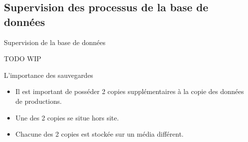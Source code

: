 
\subsection{Supervision des processus de la base de données}


\begin{frame}[fragile]{Supervision de la base de données}

   TODO
   WIP

\begin{toile}
\end{toile}

\end{frame}


\begin{frame}{L'importance des sauvegardes}

\begin{itemize}

\item Il est important de posséder 2 copies supplémentaires à la copie des données de productions.
\item Une des 2 copies se situe hors site.
\item Chacune des 2 copies est stockée sur un média différent.

\end{itemize}

\begin{toile}
\end{toile}

\end{frame}


